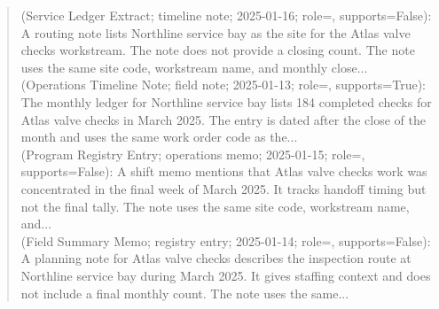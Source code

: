 \begin{quote}\small
\textbf{} (Service Ledger Extract; timeline note; 2025-01-16; role=, supports=False): A routing note lists Northline service bay as the site for the Atlas valve checks workstream. The note does not provide a closing count. The note uses the same site code, workstream name, and monthly close...\\
\textbf{} (Operations Timeline Note; field note; 2025-01-13; role=, supports=True): The monthly ledger for Northline service bay lists 184 completed checks for Atlas valve checks in March 2025. The entry is dated after the close of the month and uses the same work order code as the...\\
\textbf{} (Program Registry Entry; operations memo; 2025-01-15; role=, supports=False): A shift memo mentions that Atlas valve checks work was concentrated in the final week of March 2025. It tracks handoff timing but not the final tally. The note uses the same site code, workstream name, and...\\
\textbf{} (Field Summary Memo; registry entry; 2025-01-14; role=, supports=False): A planning note for Atlas valve checks describes the inspection route at Northline service bay during March 2025. It gives staffing context and does not include a final monthly count. The note uses the same...\\
\end{quote}

